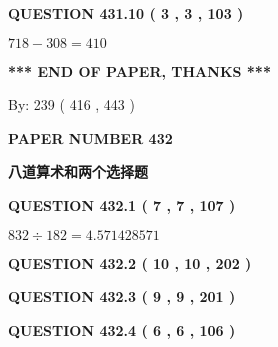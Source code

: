\documentclass{ctexart}
\begin{document}
{\textbf{\Large{QUESTION
431.10 
 ( 3 , 3 , 103 )
}}}
  
  
 
 

$ %
718 -  %
308=   %
410$
 
 
   
   
 \vspace{0.2in}
 
   
   
   
   
\vspace{1.0in} 
{\textbf{\large{ *** END OF PAPER, THANKS *** }}} 
   
   
\hspace{1.0in} By: 
 239 ( 416 ,  443 )
   
   
   
   
\newpage 
\setcounter{page}{ 
   432001 } 
   
   
   
   
 {\textbf{ \Large{ PAPER NUMBER  432  }}}
   
   
\vspace{0.2in}
   
   
   
   
   
   
 \vspace{0.2in}
{\LARGE {\textbf{ 八道算术和两个选择题}}}
   
   
  
\vspace{0.2in}
  
{\textbf{\Large{QUESTION
432.1 
 ( 7 , 7 , 107 )
}}}
  
  
 
 

$ %
832 \div  %
182=   %
4.571428571$
 
 
  
\vspace{0.2in}
  
{\textbf{\Large{QUESTION
432.2 
 ( 10 , 10 , 202 )
}}}
  
  
  
\vspace{0.2in}
  
{\textbf{\Large{QUESTION
432.3 
 ( 9 , 9 , 201 )
}}}
  
  
  
\vspace{0.2in}
  
{\textbf{\Large{QUESTION
432.4 
 ( 6 , 6 , 106 )
}}}
  
\end{document}
